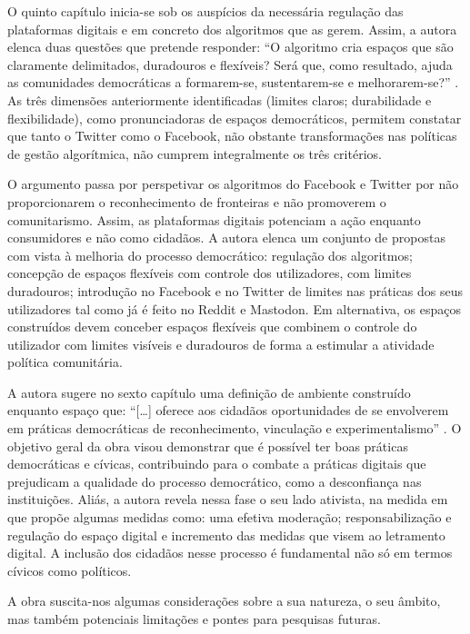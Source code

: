 \documentclass[portuguese]{textolivre}
\begin{document}
O quinto capítulo inicia-se sob os auspícios da necessária regulação das plataformas digitais e em concreto dos algoritmos que as gerem. Assim, a autora elenca duas questões que pretende responder: “O algoritmo cria espaços que são claramente delimitados, duradouros e flexíveis? Será que, como resultado, ajuda as comunidades democráticas a formarem-se, sustentarem-se e melhorarem-se?” \cite[p. 141, tradução nossa]{forestal_designing_2021}. As três dimensões anteriormente identificadas (limites claros; durabilidade e flexibilidade), como pronunciadoras de espaços democráticos, permitem constatar que tanto o Twitter como o Facebook, não obstante transformações nas políticas de gestão algorítmica, não cumprem integralmente os três critérios.

O argumento passa por perspetivar os algoritmos do Facebook e Twitter por não proporcionarem o reconhecimento de fronteiras e não promoverem o comunitarismo. Assim, as plataformas digitais potenciam a ação enquanto consumidores e não como cidadãos. A autora elenca um conjunto de propostas com vista à melhoria do processo democrático: regulação dos algoritmos; concepção de espaços flexíveis com controle dos utilizadores, com limites duradouros; introdução no Facebook e no Twitter de limites nas práticas dos seus utilizadores tal como já é feito no Reddit e Mastodon. Em alternativa, os espaços construídos devem conceber espaços flexíveis que combinem o controle do utilizador com limites visíveis e duradouros de forma a estimular a atividade política comunitária.

A autora sugere no sexto capítulo uma definição de ambiente construído enquanto espaço que: “[…] oferece aos cidadãos oportunidades de se envolverem em práticas democráticas de reconhecimento, vinculação e experimentalismo” \cite[p. 180, tradução nossa]{forestal_designing_2021}. O objetivo geral da obra visou demonstrar que é possível ter boas práticas democráticas e cívicas, contribuindo para o combate a práticas digitais que prejudicam a qualidade do processo democrático, como a desconfiança nas instituições. Aliás, a autora revela nessa fase o seu lado ativista, na medida em que propõe algumas medidas como: uma efetiva moderação; responsabilização e regulação do espaço digital e incremento das medidas que visem ao letramento digital. A inclusão dos cidadãos nesse processo é fundamental não só em termos cívicos como políticos.

A obra suscita-nos algumas considerações sobre a sua natureza, o seu âmbito, mas também potenciais limitações e pontes para pesquisas futuras.
\end{document}
